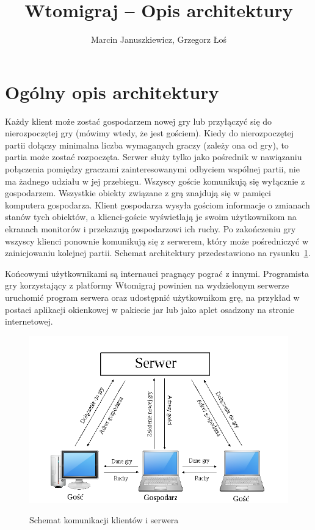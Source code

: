 \documentclass[a4paper, 12pt]{article}
\author{Marcin Januszkiewicz, Grzegorz Łoś}
\title{\textbf{Wtomigraj} -- Opis architektury}
\begin{document}


\setcounter{page}{2}

\tableofcontents

\break

\section{Ogólny opis architektury}

Każdy klient może zostać gospodarzem nowej gry lub przyłączyć się do nierozpoczętej gry (mówimy wtedy, że jest gościem). Kiedy do nierozpoczętej partii dołączy minimalna liczba wymaganych graczy (zależy ona od gry), to partia może zostać rozpoczęta. Serwer służy tylko jako pośrednik w nawiązaniu połączenia pomiędzy graczami zainteresowanymi odbyciem wspólnej partii, nie ma żadnego udziału w jej przebiegu. Wszyscy goście komunikują się wyłącznie z gospodarzem. Wszystkie obiekty związane z grą znajdują się w pamięci komputera gospodarza. Klient gospodarza wysyła gościom informacje o zmianach stanów tych obiektów, a klienci-goście wyświetlają je swoim użytkownikom na ekranach monitorów i przekazują gospodarzowi ich ruchy. Po zakończeniu gry wszyscy klienci ponownie komunikują się z serwerem, który może pośredniczyć w zainicjowaniu kolejnej partii. Schemat architektury przedestawiono na rysunku~\ref{fig:arch}.

Końcowymi użytkownikami są internauci pragnący pograć z innymi. Programista gry korzystający z platformy Wtomigraj powinien na wydzielonym serwerze uruchomić program serwera oraz udostępnić użytkownikom grę, na przykład w postaci aplikacji okienkowej w pakiecie jar lub jako aplet osadzony na stronie internetowej.

\begin{figure}
\centering
\caption{Schemat komunikacji klientów i serwera}
\includegraphics[scale=0.6]{rysunki/arch.png}
\label{fig:arch}
\end{figure}
\end{document}
